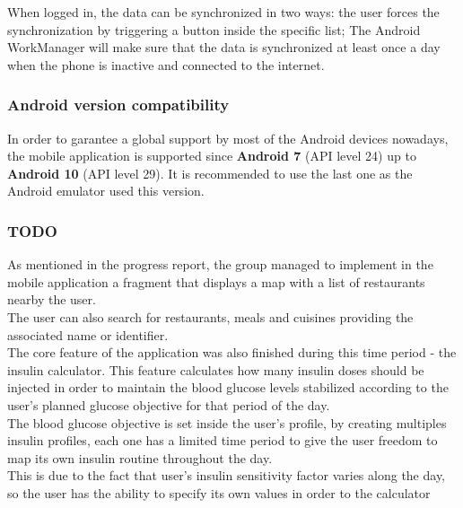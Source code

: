 When logged in, the data can be synchronized in two ways: the user forces the synchronization by triggering a button inside the specific list;
The Android WorkManager will make sure that the data is synchronized at least once a 
day when the phone is inactive and connected to the internet.

\subsubsection{Android version compatibility}

In order to garantee a global support by most of the Android devices nowadays, the mobile application is supported since \textbf{Android 7} (API level 24)
up to \textbf{Android 10} (API level 29). It is recommended to use the last one as the Android emulator used this version.

\subsubsection{TODO}
As mentioned in the progress report, the group managed to implement in the mobile application a fragment that displays a map with a list of restaurants nearby the user.\\

The user can also search for restaurants, meals and cuisines providing the associated name or identifier.\\

The core feature of the application was also finished during this time period - the insulin calculator. This feature calculates how many insulin doses should be injected
in order to maintain the blood glucose levels stabilized according to the user's planned glucose objective for that period of the day.\\

The blood glucose objective is set inside the user's profile, by creating multiples insulin profiles, each one has a limited time period to give the user freedom to map its
own insulin routine throughout the day.\\

This is due to the fact that user's insulin sensitivity factor varies along the day, so the user has the ability to specify its own values in order to the calculator\\
